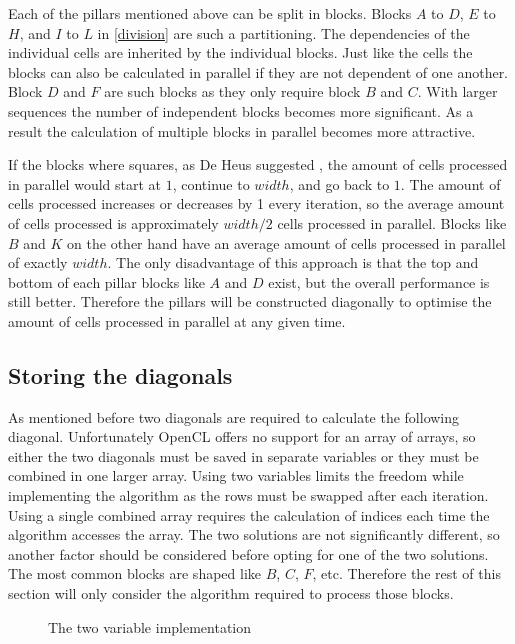 Each of the pillars mentioned above can be split in blocks.
Blocks $A$ to $D$, $E$ to $H$, and $I$ to $L$ in \cref{division} are such a partitioning.
The dependencies of the individual cells are inherited by the individual blocks.
Just like the cells the blocks can also be calculated in parallel if they are not dependent of one another.
Block $D$ and $F$ are such blocks as they only require block $B$ and $C$.
With larger sequences the number of independent blocks becomes more significant.
As a result the calculation of multiple blocks in parallel becomes more attractive.

If the blocks where squares, as De Heus suggested \cite{Heus}, the amount of cells processed in parallel would start at $1$, continue to $width$, and go back to $1$.
The amount of cells processed increases or decreases by 1 every iteration, so the average amount of cells processed is approximately $width/2$ cells processed in parallel.
Blocks like $B$ and $K$ on the other hand have an average amount of cells processed in parallel of exactly $width$.
The only disadvantage of this approach is that the top and bottom of each pillar blocks like $A$ and $D$ exist, but the overall performance is still better.
Therefore the pillars will be constructed diagonally to optimise the amount of cells processed in parallel at any given time.

\subsection{Storing the diagonals} \label{section:diagonal}
As mentioned before two diagonals are required to calculate the following diagonal.
Unfortunately OpenCL offers no support for an array of arrays, so either the two diagonals must be saved in separate variables or they must be combined in one larger array.
Using two variables limits the freedom while implementing the algorithm as the rows must be swapped after each iteration.
Using a single combined array requires the calculation of indices each time the algorithm accesses the array.
The two solutions are not significantly different, so another factor should be considered before opting for one of the two solutions.
The most common blocks are shaped like $B$, $C$, $F$, etc.
Therefore the rest of this section will only consider the algorithm required to process those blocks.

\begin{figure}[p]
    \centering
    \subfloat[][Input]{\label{twovarsinput}}
    \subfloat[][Output]{\label{twovarsoutput}}
    \caption{The two variable implementation} \label{twovars}
\end{figure}

